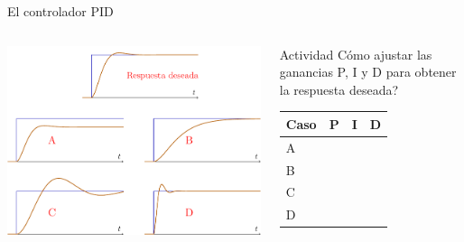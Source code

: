 \documentclass[presentation,aspectratio=169, usenames, dvipsnames]{beamer}
\begin{document}
\begin{frame}[label={sec:org730c919}]{El controlador PID}
\begin{columns}
\begin{column}{0.6\columnwidth}
\begin{center}
\includegraphics[width=0.99\linewidth]{../../figures/stepresponse-secondorder-exercise}
\end{center}
\end{column}

\begin{column}{0.4\columnwidth}
\alert{Actividad} Cómo ajustar las ganancias P, I y D para obtener la respuesta deseada?

\begin{center}
\begin{tabular}{llll}
Caso & \textcolor{ppc}{P} & \textcolor{iic}{I} & \textcolor{ddc}{D}\\
\hline
A &  &  & \\
B &  &  & \\
C &  &  & \\
D &  &  & \\
\hline
\end{tabular}
\end{center}
\end{column}
\end{columns}
\end{frame}
\end{document}
